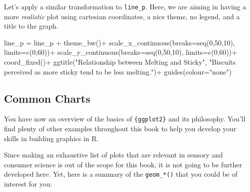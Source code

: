 \documentclass[
]{book}
\newenvironment{Shaded}{\begin{snugshade}}{\end{snugshade}}
\newcommand{\AttributeTok}[1]{\textcolor[rgb]{0.77,0.63,0.00}{#1}}
\newcommand{\DecValTok}[1]{\textcolor[rgb]{0.00,0.00,0.81}{#1}}
\newcommand{\FunctionTok}[1]{\textcolor[rgb]{0.00,0.00,0.00}{#1}}
\newcommand{\NormalTok}[1]{#1}
\newcommand{\OtherTok}[1]{\textcolor[rgb]{0.56,0.35,0.01}{#1}}
\newcommand{\SpecialCharTok}[1]{\textcolor[rgb]{0.00,0.00,0.00}{#1}}
\newcommand{\StringTok}[1]{\textcolor[rgb]{0.31,0.60,0.02}{#1}}
\begin{document}
Let's apply a similar transformation to \texttt{line\_p}. Here, we are aiming in having a more \emph{realistic} plot using cartesian coordinates, a nice theme, no legend, and a title to the graph.

\begin{Shaded}
\begin{Highlighting}[]
\NormalTok{line\_p }\OtherTok{=}\NormalTok{ line\_p }\SpecialCharTok{+}
  \FunctionTok{theme\_bw}\NormalTok{()}\SpecialCharTok{+}
  \FunctionTok{scale\_x\_continuous}\NormalTok{(}\AttributeTok{breaks=}\FunctionTok{seq}\NormalTok{(}\DecValTok{0}\NormalTok{,}\DecValTok{50}\NormalTok{,}\DecValTok{10}\NormalTok{), }\AttributeTok{limits=}\FunctionTok{c}\NormalTok{(}\DecValTok{0}\NormalTok{,}\DecValTok{60}\NormalTok{))}\SpecialCharTok{+}
  \FunctionTok{scale\_y\_continuous}\NormalTok{(}\AttributeTok{breaks=}\FunctionTok{seq}\NormalTok{(}\DecValTok{0}\NormalTok{,}\DecValTok{50}\NormalTok{,}\DecValTok{10}\NormalTok{), }\AttributeTok{limits=}\FunctionTok{c}\NormalTok{(}\DecValTok{0}\NormalTok{,}\DecValTok{60}\NormalTok{))}\SpecialCharTok{+}
  \FunctionTok{coord\_fixed}\NormalTok{()}\SpecialCharTok{+}
  \FunctionTok{ggtitle}\NormalTok{(}\StringTok{"Relationship between Melting and Sticky"}\NormalTok{, }\StringTok{"Biscuits perceived as more sticky tend to be less melting."}\NormalTok{)}\SpecialCharTok{+}
  \FunctionTok{guides}\NormalTok{(}\AttributeTok{colour=}\StringTok{"none"}\NormalTok{)}
\end{Highlighting}
\end{Shaded}

\hypertarget{common-charts}{%
\subsection{Common Charts}\label{common-charts}}

You have now an overview of the basics of \texttt{\{ggplot2\}} and its philosophy. You'll find plenty of other examples throughout this book to help you develop your skills in building graphics in R.

Since making an exhaustive list of plots that are relevant in sensory and consumer science is out of the scope for this book, it is not going to be further developed here. Yet, here is a summary of the \texttt{geom\_*()} that you could be of interest for you:
\end{document}
